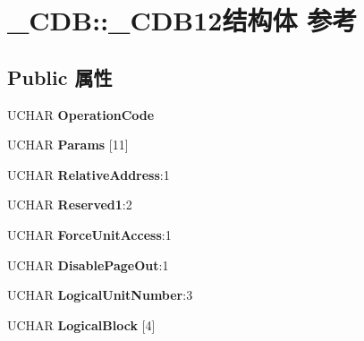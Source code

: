 \hypertarget{struct___c_d_b_1_1___c_d_b12}{}\section{\+\_\+\+C\+DB\+:\+:\+\_\+\+C\+D\+B12结构体 参考}
\label{struct___c_d_b_1_1___c_d_b12}
\subsection*{Public 属性}
\begin{DoxyCompactItemize}
\item 
\mbox{\label{struct___c_d_b_1_1___c_d_b12_adf9ecffa2f2eb43de682d4c137877228}} 
U\+C\+H\+AR {\bfseries Operation\+Code}
\item 
\mbox{\label{struct___c_d_b_1_1___c_d_b12_a2b90204606554fb1b16eed679b6c43d3}} 
U\+C\+H\+AR {\bfseries Params} \mbox{[}11\mbox{]}
\item 
\mbox{\label{struct___c_d_b_1_1___c_d_b12_aca1f1bce5ee7427a51c37c5ef18d761f}} 
U\+C\+H\+AR {\bfseries Relative\+Address}\+:1
\item 
\mbox{\label{struct___c_d_b_1_1___c_d_b12_a4a737a0d8622e6481a55fc5ca13456c2}} 
U\+C\+H\+AR {\bfseries Reserved1}\+:2
\item 
\mbox{\label{struct___c_d_b_1_1___c_d_b12_a402b8599d8804f5145f30e7d543ea02e}} 
U\+C\+H\+AR {\bfseries Force\+Unit\+Access}\+:1
\item 
\mbox{\label{struct___c_d_b_1_1___c_d_b12_a3d3ef8b62d7fb90fa0469bb828ee84a5}} 
U\+C\+H\+AR {\bfseries Disable\+Page\+Out}\+:1
\item 
\mbox{\label{struct___c_d_b_1_1___c_d_b12_a4e2eb21b66249002bde8b787a05f04f3}} 
U\+C\+H\+AR {\bfseries Logical\+Unit\+Number}\+:3
\item 
\mbox{\label{struct___c_d_b_1_1___c_d_b12_ad64d79102578a43afd789e383615417e}} 
U\+C\+H\+AR {\bfseries Logical\+Block} \mbox{[}4\mbox{]}

\end{DoxyCompactItemize}
